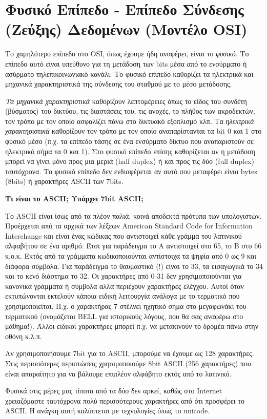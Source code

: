 %
%
\section{Φυσικό Επίπεδο - Επίπεδο Σύνδεσης (Ζεύξης) Δεδομένων (Μοντέλο OSI)}

Το χαμηλότερο επίπεδο στο OSI, όπως έχουμε ήδη αναφέρει, είναι το \emph{φυσικό}. Το επίπεδο αυτό είναι υπεύθυνο για τη μετάδοση των bits μέσα από το ενσύρματο ή ασύρματο τηλεπικοινωνιακό κανάλι. Το φυσικό επίπεδο καθορίζει τα ηλεκτρικά και μηχανικά χαρακτηριστικά της σύνδεσης του σταθμού με το μέσο μετάδοσης.

\emph{Τα μηχανικά χαρακτηριστικά} καθορίζουν λεπτομέρειες όπως το  είδος του συνδέτη (βύσματος) του δικτύου, τις διαστάσεις του, τις ανοχές, το πλήθος των ακροδεκτών, τον τρόπο με τον οποίο ασφαλίζει πάνω στο δικτυακό εξοπλισμό κλπ. Τα \emph{ηλεκτρικά χαρακτηριστικά} καθορίζουν τον τρόπο με τον οποίο αναπαρίστανται τα bit 0 και 1 στο φυσικό μέσο (π.χ. τα επίπεδο τάσης σε ένα ενσύρματο δίκτυο που αναπαριστούν σε ηλεκτρικό σήμα τα 0 και 1). Στο φυσικό επίπεδο επίσης καθορίζεται αν η μετάδοση μπορεί να γίνει μόνο προς μια μεριά (half duplex) ή και προς τις δύο (full duplex) ταυτόχρονα. Το φυσικό επίπεδο δεν ενδιαφέρεται αν αυτό που μεταφέρει είναι bytes (8bits) ή χαρακτήρες ASCII των 7bits. 

\begin{inthebox}
\textbf{Τι είναι το ASCII; Υπάρχει 7bit ASCII;}

Το ASCII είναι ίσως από τα πλέον παλιά, κοινά αποδεκτά πρότυπα των υπολογιστών. Προέρχεται από τα αρχικά των λέξεων American Standard Code for Information Interchange και είναι ένας κώδικας που αντιστοιχεί κάθε γράμμα του λατινικού αλφαβήτου σε ένα αριθμό. Έτσι για παράδειγμα το A αντιστοιχεί στο 65, το B στο 66 κ.ο.κ. Εκτός από τα γράμματα κωδικοποιούνται αντίστοιχα τα ψηφία από 0 ως 9 και διάφορα σύμβολα. Για παράδειγμα το θαυμαστικό (!) είναι το 33, τα εισαγωγικά το 34 και το κενό διάστημα το 32. Οι χαρακτήρες από 0-31 δεν χρησιμοποιούνται για κανονικά γράμματα ή σύμβολα αλλά περιέχουν χαρακτήρες ελέγχου. Αυτοί όταν εκτυπώνονται εκτελούν κάποια ειδική λειτουργία ανάλογα με το τερματικό που χρησιμοποιείται. Π.χ. ο χαρακτήρας 7 στέλνει ηχητικό σήμα στο μεγαφωνάκι του τερματικού (ονομάζεται  BELL για ιστορικούς λόγους, που θα σας αναφέρω στο μάθημα!). Άλλοι ειδικοί χαρακτήρες μπορεί π.χ. να μετακινούν το δρομέα πάνω στην οθόνη κ.λ.π.

Αν χρησιμοποιήσουμε 7bit για το ASCII, μπορούμε να έχουμε ως 128 χαρακτήρες. Στις περισσότερες περιπτώσεις χρησιμοποιούμε 8bit ASCII (256 χαρακτήρες) που είναι απαραίτητο για να βάλουμε επιπλέον αλφάβητο εκτός από το λατινικό.

Φυσικά στις μέρες μας τίποτα από τα δύο δεν αρκεί, καθώς στο Internet χρειαζόμαστε ταυτόχρονα πολύ περισσότερους χαρακτήρες από ότι προσφέρει το ASCII. Η ανάγκη αυτή καλύπτεται με τεχνολογίες όπως το unicode.\\
\end{inthebox}

